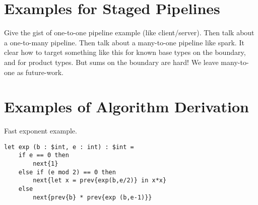 \documentclass{sigplanconf}
\begin{document}

\section{Examples for Staged Pipelines}

Give the gist of one-to-one pipeline example (like client/server).
Then talk about a one-to-many pipeline.
Then talk about a many-to-one pipeline like spark.  It clear how to target something like this for known base types on the boundary, and for product types.  But sums on the boundary are hard!  We leave many-to-one as future-work.


\section{Examples of Algorithm Derivation}

Fast exponent example.  

\begin{lstlisting} 
let exp (b : $int, e : int) : $int =
	if e == 0 then
		next{1}
	else if (e mod 2) == 0 then
		next{let x = prev{exp(b,e/2)} in x*x}
	else
		next{prev{b} * prev{exp (b,e-1)}}		
\end{lstlisting}
\end{document}
